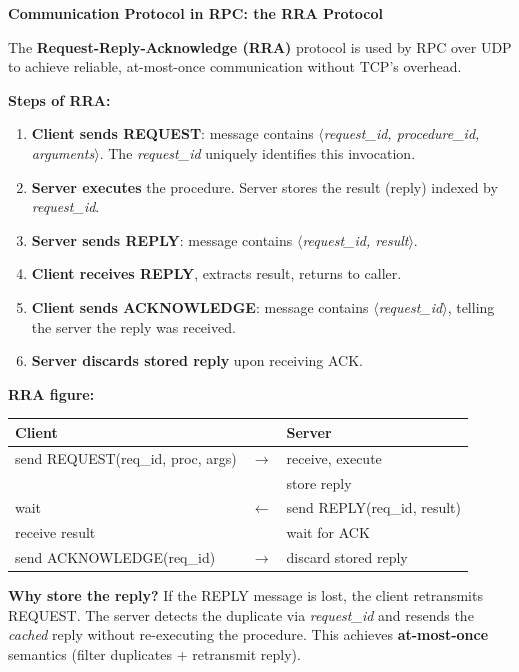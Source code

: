 \documentclass[11pt,a4paper]{article}
\newcommand{\key}[1]{\textbf{\textcolor{keyred}{#1}}}
\begin{document}
\begin{answerbox}
\textbf{Communication Protocol in RPC: the RRA Protocol}

The \key{Request-Reply-Acknowledge (RRA)} protocol is used by RPC over UDP to achieve reliable, at-most-once communication without TCP's overhead.

\textbf{Steps of RRA:}
\begin{enumerate}
  \item \textbf{Client sends REQUEST}: message contains $\langle$\textit{request\_id, procedure\_id, arguments}$\rangle$. The \textit{request\_id} uniquely identifies this invocation.
  \item \textbf{Server executes} the procedure. Server stores the result (reply) indexed by \textit{request\_id}.
  \item \textbf{Server sends REPLY}: message contains $\langle$\textit{request\_id, result}$\rangle$.
  \item \textbf{Client receives REPLY}, extracts result, returns to caller.
  \item \textbf{Client sends ACKNOWLEDGE}: message contains $\langle$\textit{request\_id}$\rangle$, telling the server the reply was received.
  \item \textbf{Server discards stored reply} upon receiving ACK.
\end{enumerate}

\textbf{RRA figure:}
\begin{center}
\begin{tabular}{lll}
\textbf{Client} & & \textbf{Server} \\
\hline
send REQUEST(req\_id, proc, args) & $\longrightarrow$ & receive, execute \\
 & & store reply \\
wait & $\longleftarrow$ & send REPLY(req\_id, result) \\
receive result & & wait for ACK \\
send ACKNOWLEDGE(req\_id) & $\longrightarrow$ & discard stored reply \\
\end{tabular}
\end{center}

\textbf{Why store the reply?} If the REPLY message is lost, the client retransmits REQUEST. The server detects the duplicate via \textit{request\_id} and resends the \emph{cached} reply without re-executing the procedure. This achieves \textbf{at-most-once} semantics (filter duplicates + retransmit reply).


\end{answerbox}
\end{document}
